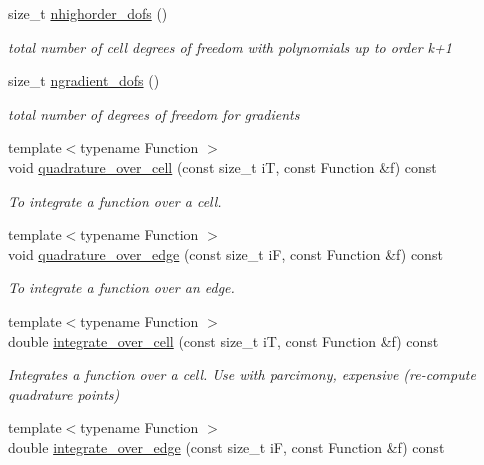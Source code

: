 \begin{DoxyCompactItemize}
size\+\_\+t \hyperlink{group__HybridCore2D_gaa7f78bc066429a18ad596d45a79d37bc}{nhighorder\+\_\+dofs} ()
\begin{DoxyCompactList}\small\item\em total number of cell degrees of freedom with polynomials up to order k+1 \end{DoxyCompactList}\item 
size\+\_\+t \hyperlink{group__HybridCore2D_ga6f7c5ef5103bed8a3e0ecc18d592b1f9}{ngradient\+\_\+dofs} ()
\begin{DoxyCompactList}\small\item\em total number of degrees of freedom for gradients \end{DoxyCompactList}\item 
{\footnotesize template$<$typename Function $>$ }\\void \hyperlink{group__HybridCore2D_ga3c33c8cec55dbe2d8873e53fcd43d01f}{quadrature\+\_\+over\+\_\+cell} (const size\+\_\+t iT, const Function \&f) const
\begin{DoxyCompactList}\small\item\em To integrate a function over a cell. \end{DoxyCompactList}\item 
{\footnotesize template$<$typename Function $>$ }\\void \hyperlink{group__HybridCore2D_gafbf9c61f2d929331197ba971b52b8710}{quadrature\+\_\+over\+\_\+edge} (const size\+\_\+t iF, const Function \&f) const
\begin{DoxyCompactList}\small\item\em To integrate a function over an edge. \end{DoxyCompactList}\item 
{\footnotesize template$<$typename Function $>$ }\\double \hyperlink{group__HybridCore2D_ga64ffbc44306e06018efe3cea5a62f652}{integrate\+\_\+over\+\_\+cell} (const size\+\_\+t iT, const Function \&f) const
\begin{DoxyCompactList}\small\item\em Integrates a function over a cell. Use with parcimony, expensive (re-\/compute quadrature points) \end{DoxyCompactList}\item 
{\footnotesize template$<$typename Function $>$ }\\double \hyperlink{group__HybridCore2D_ga03f276ea9c905d64662c39b7555d560c}{integrate\+\_\+over\+\_\+edge} (const size\+\_\+t iF, const Function \&f) const

\end{DoxyCompactItemize}
